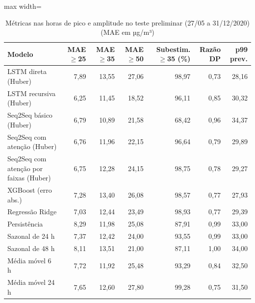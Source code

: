\begin{table}[!htbp]
    \centering
    \caption{Métricas nas horas de pico e amplitude no teste preliminar (27/05 a 31/12/2020) (MAE em µg/m³)}
    \label{tab:cauda_teste_historico}
    \small
    \begin{adjustbox}{max width=\textwidth}
    \begin{tabular}{lrrrrrr}
        \toprule
        Modelo & MAE $\geq$25 & MAE $\geq$35 & MAE $\geq$50 & Subestim. $\geq$35 (\%) & Razão DP & p99 prev. \\
        \midrule
        LSTM direta (Huber) & 7,89 & 13,55 & 27,06 & 98,97 & 0,73 & 28,16 \\
        LSTM recursiva (Huber) & 6,25 & 11,45 & 18,52 & 96,11 & 0,85 & 30,32 \\
        Seq2Seq básico (Huber) & 6,79 & 10,89 & 21,58 & 68,42 & 0,96 & 34,37 \\
        Seq2Seq com atenção (Huber) & 6,76 & 11,96 & 22,15 & 96,64 & 0,79 & 29,89 \\
        Seq2Seq com atenção por faixas (Huber) & 6,75 & 12,28 & 24,15 & 98,75 & 0,78 & 29,27 \\
        XGBoost (erro abs.) & 7,28 & 13,40 & 26,08 & 98,57 & 0,77 & 27,93 \\
        Regressão Ridge & 7,03 & 12,44 & 23,49 & 98,93 & 0,77 & 29,39 \\
        \midrule
        Persistência & 8,29 & 11,98 & 25,08 & 87,91 & 0,99 & 33,00 \\
        Sazonal de 24 h & 7,37 & 12,42 & 24,00 & 93,55 & 0,99 & 33,00 \\
        Sazonal de 48 h & 8,11 & 13,51 & 21,00 & 87,11 & 1,00 & 34,00 \\
        Média móvel 6 h & 7,72 & 11,92 & 25,48 & 93,29 & 0,84 & 32,50 \\
        Média móvel 24 h & 7,65 & 12,60 & 27,80 & 99,28 & 0,75 & 31,50 \\
        \bottomrule
    \end{tabular}
    \end{adjustbox}
\end{table}
